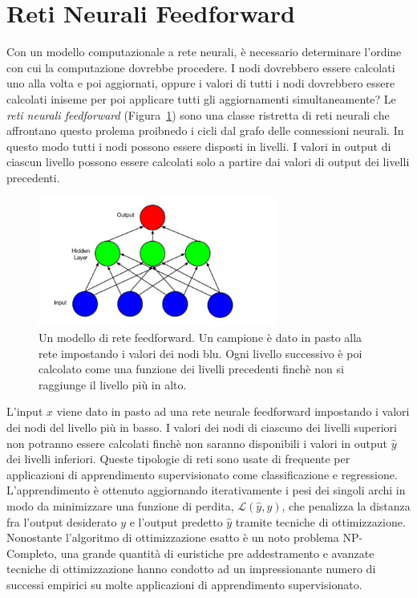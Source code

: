 \section{Reti Neurali Feedforward}
Con un modello computazionale a rete neurali, \`e necessario determinare l'ordine con cui la computazione dovrebbe procedere.
I nodi dovrebbero essere calcolati uno alla volta e poi aggiornati, oppure i valori di tutti i nodi dovrebbero essere calcolati iniseme per poi applicare tutti gli aggiornamenti simultaneamente?
Le \emph{reti neurali feedforward} (Figura~\ref{fig:feedforwardNeuralNetwork}) sono una classe ristretta di reti neurali che affrontano questo prolema proibnedo i cicli dal grafo delle connessioni neurali.
In questo modo tutti i nodi possono essere disposti in livelli.
I valori in output di ciascun livello possono essere calcolati solo a partire dai valori di output dei livelli precedenti.
\begin{figure}[tp]
  \centering
  \begin{center}
    \includegraphics[width=0.7\textwidth]{./images/feedForwardNeuralNetwork.png}
  \end{center}
  \caption{Un modello di rete feedforward.
  Un campione \`e dato in pasto alla rete impostando i valori dei nodi blu.
  Ogni livello successivo \`e poi calcolato come una funzione dei livelli precedenti finch\`e non si raggiunge il livello pi\`u in alto.}
  \label{fig:feedforwardNeuralNetwork}
\end{figure}

L'input $x$ viene dato in pasto ad una rete neurale feedforward impostando i valori dei nodi del livello pi\`u in basso.
I valori dei nodi di ciascuno dei livelli superiori non potranno essere calcolati finch\`e non saranno disponibili i valori in output $\hat{y}$ dei livelli inferiori.
Queste tipologie di reti sono usate di frequente per applicazioni di apprendimento supervisionato come classificazione e regressione.
L'apprendimento \`e ottenuto aggiornando iterativamente i pesi dei singoli archi in modo da minimizzare una funzione di perdita, $\mathcal{L}(\hat{y},y)$, che penalizza la distanza fra l'output desiderato $y$ e l'output predetto $\hat{y}$ tramite tecniche di ottimizzazione.
Nonostante l'algoritmo di ottimizzazione esatto \`e un noto problema NP-Completo, una grande quantit\`a di euristiche pre addestramento e avanzate tecniche di ottimizzazione hanno condotto ad un impressionante numero di successi empirici su molte applicazioni di apprendimento supervisionato.

